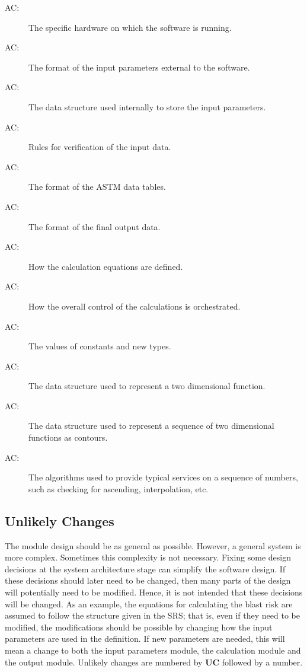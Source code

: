 \documentclass[12pt]{article}
\newcounter{acnum}
\newcommand{\actheacnum}{AC\theacnum}
\begin{document}
\begin{description}

\item[ \actheacnum \label{acHardware}:] The specific
  hardware on which the software is running.
\item[ \actheacnum \label{acInputFormat}:] The format of the
  input parameters external to the software.
\item[ \actheacnum \label{acParamsStruct}:] The data structure
  used internally to store the input parameters.
\item[ \actheacnum \label{acVerific}:] Rules for
  verification of the input data.
\item[ \actheacnum \label{acInASTMFormat}:] The format of the
  ASTM data tables.
\item[ \actheacnum \label{acOutput}:] The format of the
  final output data.
\item[ \actheacnum \label{acCalc}:] How the calculation
  equations are defined.
\item[ \actheacnum \label{acControl}:] How the overall
  control of the calculations is orchestrated.
\item[ \actheacnum \label{acConstants}:] The values of
  constants and new types.
\item[ \actheacnum \label{acFuncts}:] The data structure
  used to represent a two dimensional function.
\item[ \actheacnum \label{acContours}:] The data structure used
  to represent a sequence of two dimensional functions as contours.
\item[ \actheacnum \label{acSeqServices}:] The algorithms
  used to provide typical services on a sequence of numbers, such as checking
  for ascending, interpolation, etc.

\end{description}

\subsection{Unlikely Changes} \label{SecUchange}

The module design should be as general as possible. However, a general system is
more complex. Sometimes this complexity is not necessary. Fixing some design
decisions at the system architecture stage can simplify the software design. If
these decisions should later need to be changed, then many parts of the design
will potentially need to be modified. Hence, it is not intended that these
decisions will be changed.  As an example, the equations for calculating the 
blast risk  are assumed to follow the structure given in the SRS; that is,
even if they need to be modified, the modifications should be possible by
changing how the input parameters are used in the definition.  If new parameters
are needed, this will mean a change to both the input parameters module, the
calculation module and the output module.
 Unlikely changes are numbered by \textbf{UC}
followed by a number.
\end{document}
